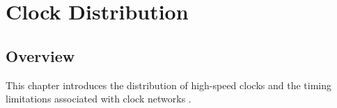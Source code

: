\chapter{Clock Distribution}

\section{Overview}

This chapter introduces the distribution of high-speed clocks
and the timing limitations associated with clock networks
\citep{palermo2025ecen720}.





